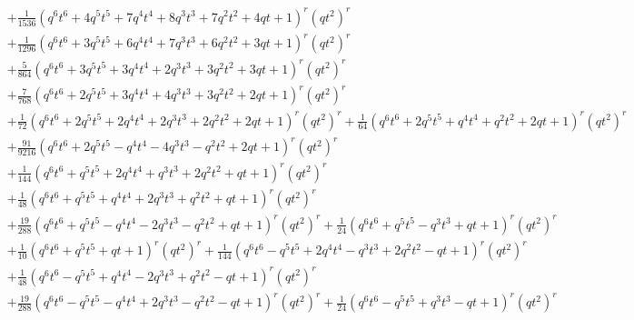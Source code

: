 \documentclass[11pt,english]{amsart}
\numberwithin{equation}{section}
\numberwithin{figure}{section}
\theoremstyle{plain}
\theoremstyle{plain}
\theoremstyle{definition}
\theoremstyle{remark}
\begin{document}
{\begin{align*}
& + \frac{1}{1536}  {\left(q^{6} t^{6} + 4  q^{5} t^{5} + 7  q^{4} t^{4} + 8  q^{3} t^{3} + 7  q^{2} t^{2} + 4  q t + 1\right)}^{r} \left(q t^{2}\right)^{r} \\
& + \frac{1}{1296}  {\left(q^{6} t^{6} + 3  q^{5} t^{5} + 6  q^{4} t^{4} + 7  q^{3} t^{3} + 6  q^{2} t^{2} + 3  q t + 1\right)}^{r} \left(q t^{2}\right)^{r} \\
& + \frac{5}{864}  {\left(q^{6} t^{6} + 3  q^{5} t^{5} + 3  q^{4} t^{4} + 2  q^{3} t^{3} + 3  q^{2} t^{2} + 3  q t + 1\right)}^{r} \left(q t^{2}\right)^{r} \\
& + \frac{7}{768}  {\left(q^{6} t^{6} + 2  q^{5} t^{5} + 3  q^{4} t^{4} + 4  q^{3} t^{3} + 3  q^{2} t^{2} + 2  q t + 1\right)}^{r} \left(q t^{2}\right)^{r} \\
& + \frac{1}{72}  {\left(q^{6} t^{6} + 2  q^{5} t^{5} + 2  q^{4} t^{4} + 2  q^{3} t^{3} + 2  q^{2} t^{2} + 2  q t + 1\right)}^{r} \left(q t^{2}\right)^{r} + \frac{1}{64}  {\left(q^{6} t^{6} + 2  q^{5} t^{5} + q^{4} t^{4} + q^{2} t^{2} + 2  q t + 1\right)}^{r} \left(q t^{2}\right)^{r} \\
& + \frac{91}{9216}  {\left(q^{6} t^{6} + 2  q^{5} t^{5} - q^{4} t^{4} - 4  q^{3} t^{3} - q^{2} t^{2} + 2  q t + 1\right)}^{r} \left(q t^{2}\right)^{r} \\
& + \frac{1}{144}  {\left(q^{6} t^{6} + q^{5} t^{5} + 2  q^{4} t^{4} + q^{3} t^{3} + 2  q^{2} t^{2} + q t + 1\right)}^{r} \left(q t^{2}\right)^{r} \\
& + \frac{1}{48}  {\left(q^{6} t^{6} + q^{5} t^{5} + q^{4} t^{4} + 2  q^{3} t^{3} + q^{2} t^{2} + q t + 1\right)}^{r} \left(q t^{2}\right)^{r} \\
& + \frac{19}{288}  {\left(q^{6} t^{6} + q^{5} t^{5} - q^{4} t^{4} - 2  q^{3} t^{3} - q^{2} t^{2} + q t + 1\right)}^{r} \left(q t^{2}\right)^{r} + \frac{1}{24}  {\left(q^{6} t^{6} + q^{5} t^{5} - q^{3} t^{3} + q t + 1\right)}^{r} \left(q t^{2}\right)^{r} \\
& + \frac{1}{10}  {\left(q^{6} t^{6} + q^{5} t^{5} + q t + 1\right)}^{r} \left(q t^{2}\right)^{r} + \frac{1}{144}  {\left(q^{6} t^{6} - q^{5} t^{5} + 2  q^{4} t^{4} - q^{3} t^{3} + 2  q^{2} t^{2} - q t + 1\right)}^{r} \left(q t^{2}\right)^{r} \\
& + \frac{1}{48}  {\left(q^{6} t^{6} - q^{5} t^{5} + q^{4} t^{4} - 2  q^{3} t^{3} + q^{2} t^{2} - q t + 1\right)}^{r} \left(q t^{2}\right)^{r} \\
& + \frac{19}{288}  {\left(q^{6} t^{6} - q^{5} t^{5} - q^{4} t^{4} + 2  q^{3} t^{3} - q^{2} t^{2} - q t + 1\right)}^{r} \left(q t^{2}\right)^{r} + \frac{1}{24}  {\left(q^{6} t^{6} - q^{5} t^{5} + q^{3} t^{3} - q t + 1\right)}^{r} \left(q t^{2}\right)^{r} \\

\end{align*}}
\end{document}
